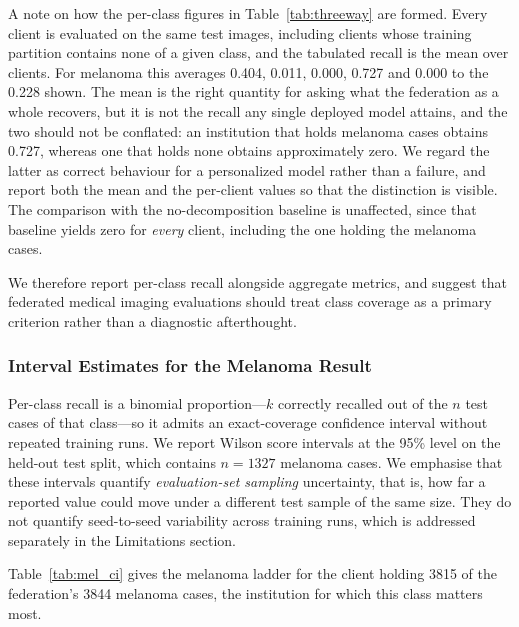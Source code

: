 \documentclass{ieeeaccess}
\begin{document}
A note on how the per-class figures in Table~\ref{tab:threeway} are formed. Every client is evaluated on the same test images, including clients whose training partition contains none of a given class, and the tabulated recall is the mean over clients. For melanoma this averages 0.404, 0.011, 0.000, 0.727 and 0.000 to the 0.228 shown. The mean is the right quantity for asking what the federation as a whole recovers, but it is not the recall any single deployed model attains, and the two should not be conflated: an institution that holds melanoma cases obtains 0.727, whereas one that holds none obtains approximately zero. We regard the latter as correct behaviour for a personalized model rather than a failure, and report both the mean and the per-client values so that the distinction is visible. The comparison with the no-decomposition baseline is unaffected, since that baseline yields zero for \emph{every} client, including the one holding the melanoma cases.

We therefore report per-class recall alongside aggregate metrics, and suggest that federated medical imaging evaluations should treat class coverage as a primary criterion rather than a diagnostic afterthought.

\subsubsection{Interval Estimates for the Melanoma Result}
\label{sec:intervals}

Per-class recall is a binomial proportion---$k$ correctly recalled out of the $n$ test cases of that class---so it admits an exact-coverage confidence interval without repeated training runs. We report Wilson score intervals at the 95\% level on the held-out test split, which contains $n = 1327$ melanoma cases. We emphasise that these intervals quantify \emph{evaluation-set sampling} uncertainty, that is, how far a reported value could move under a different test sample of the same size. They do not quantify seed-to-seed variability across training runs, which is addressed separately in the Limitations section.

Table~\ref{tab:mel_ci} gives the melanoma ladder for the client holding 3815 of the federation's 3844 melanoma cases, the institution for which this class matters most.
\end{document}
